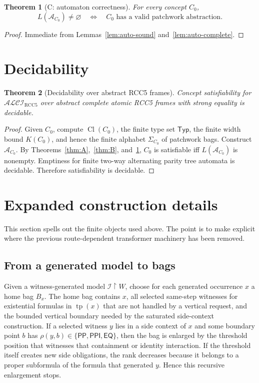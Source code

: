 \documentclass[11pt]{article}
\newtheorem{theorem}{Theorem}[section]
\newcommand{\RCC}{\mathrm{RCC5}}
\newcommand{\EQ}{\mathsf{EQ}}
\newcommand{\PP}{\mathsf{PP}}
\newcommand{\PPI}{\mathsf{PPI}}
\newcommand{\Cl}{\operatorname{Cl}}
\newcommand{\tp}{\operatorname{tp}}
\newcommand{\APTA}{\mathcal A}
\newcommand{\calI}{\mathcal I}
\begin{document}
\begin{theorem}[C: automaton correctness]\label{thm:C}
For every concept $C_0$,
\[
L(\APTA_{C_0})\neq\varnothing
\quad\Longleftrightarrow\quad
C_0\text{ has a valid patchwork abstraction.}
\]
\end{theorem}

\begin{proof}
Immediate from Lemmas~\ref{lem:auto-sound} and~\ref{lem:auto-complete}.
\end{proof}

\section{Decidability}

\begin{theorem}[Decidability over abstract RCC5 frames]\label{thm:dec}
Concept satisfiability for $\mathcal{ALCI}_{\RCC}$ over abstract complete atomic RCC5
frames with strong equality is decidable.
\end{theorem}

\begin{proof}
Given $C_0$, compute $\Cl(C_0)$, the finite type set $\mathsf{Typ}$, the finite width
bound $K(C_0)$, and hence the finite alphabet $\Sigma_{C_0}$ of patchwork bags.  Construct
$\APTA_{C_0}$.  By Theorems~\ref{thm:A},~\ref{thm:B}, and~\ref{thm:C}, $C_0$ is
satisfiable iff $L(\APTA_{C_0})$ is nonempty.  Emptiness for finite two-way alternating
parity tree automata is decidable.  Therefore satisfiability is decidable.
\end{proof}


\section{Expanded construction details}

This section spells out the finite objects used above.  The point is to make explicit
where the previous route-dependent transformer machinery has been removed.

\subsection{From a generated model to bags}

Given a witness-generated model $\calI\upharpoonright W$, choose for each generated
occurrence $x$ a home bag $B_x$.  The home bag contains $x$, all selected same-step
witnesses for existential formulas in $\tp(x)$ that are not handled by a vertical
request, and the bounded vertical boundary needed by the saturated side-context
construction.  If a selected witness $y$ lies in a side context of $x$ and some boundary
point $b$ has $\rho(y,b)\in\{\PP,\PPI,\EQ\}$, then the bag is enlarged by the threshold
position that witnesses that containment or identity interaction.  If the threshold
itself creates new side obligations, the rank decreases because it belongs to a proper
subformula of the formula that generated $y$.  Hence this recursive enlargement stops.
\end{document}

